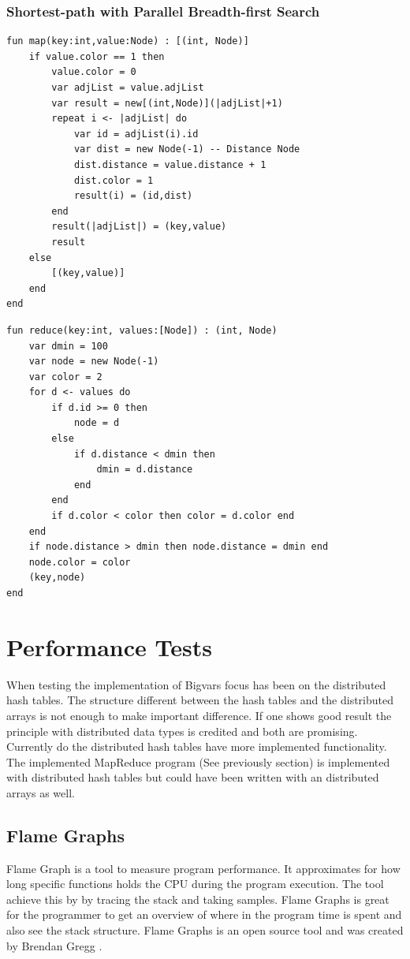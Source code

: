 \subsubsection{Shortest-path with Parallel Breadth-first Search}
\begin{lstlisting}
fun map(key:int,value:Node) : [(int, Node)]
    if value.color == 1 then
        value.color = 0
        var adjList = value.adjList
        var result = new[(int,Node)](|adjList|+1)
        repeat i <- |adjList| do
            var id = adjList(i).id
            var dist = new Node(-1) -- Distance Node
            dist.distance = value.distance + 1
            dist.color = 1
            result(i) = (id,dist)
        end
        result(|adjList|) = (key,value)
        result
    else
        [(key,value)]
    end
end
\end{lstlisting}
\begin{lstlisting}
fun reduce(key:int, values:[Node]) : (int, Node)
    var dmin = 100
    var node = new Node(-1)
    var color = 2
    for d <- values do
        if d.id >= 0 then
            node = d
        else
            if d.distance < dmin then
                dmin = d.distance
            end
        end
        if d.color < color then color = d.color end
    end
    if node.distance > dmin then node.distance = dmin end
    node.color = color
    (key,node)
end
\end{lstlisting}
\pagebreak

\section{Performance Tests}
When testing the implementation of Bigvars focus has been on the distributed hash tables. The structure different between the hash tables and the distributed arrays is not enough to make important difference. If one shows good result the principle with distributed data types is credited and both are promising. Currently do the distributed hash tables have more implemented functionality. The implemented MapReduce program (See previously section) is implemented with distributed hash tables but could have been written with an distributed arrays as well. \\ 

\subsection{Flame Graphs}
Flame Graph is a tool to measure program performance. It approximates for how long specific functions holds the CPU during the program execution. The tool achieve this by by tracing the stack and taking samples. Flame Graphs is great for the programmer to get an overview of where in the program time is spent and also see the stack structure. Flame Graphs is an open source tool and was created by Brendan Gregg \cite{flamegraph}.\\


